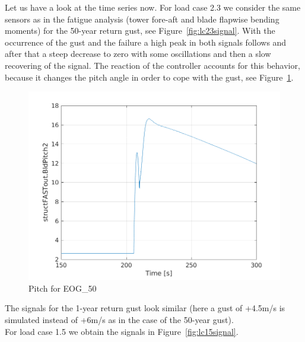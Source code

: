 \documentclass[10pt]{article}
\begin{document}
Let us have a look at the time series now. For load case 2.3 we consider the same sensors as in the fatigue analysis (tower fore-aft and blade flapwise bending moments) for the 50-year return gust, see Figure~\ref{fig:lc23signal}. With the occurrence of the gust and the failure a high peak in both signals follows and after that a steep decrease to zero with some oscillations and then a slow recovering of the signal. The reaction of the controller accounts for this behavior, because it changes the pitch angle in order to cope with the gust, see Figure~\ref{fig:lc23pitch}.
\begin{figure}[H]
  \centering
  \includegraphics[width=0.4\linewidth]{../CIP_6/FASTextreme/EOG_50/BldPitch2.png}
    \caption{Pitch for EOG\_50}
\label{fig:lc23pitch}
\end{figure}

The signals for the 1-year return gust look similar (here a gust of +4.5m/s is simulated instead of +6m/s as in the case of the 50-year gust).\\
For load case 1.5 we obtain the signals in Figure~\ref{fig:lc15signal}.
\end{document}
